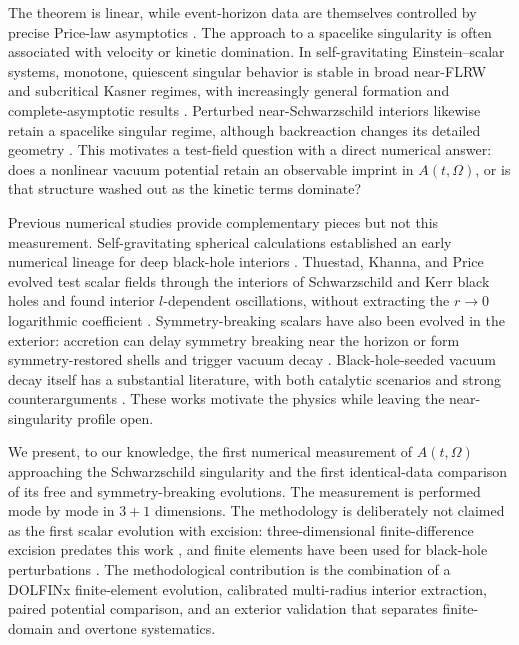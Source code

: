 \documentclass[
  aps,
  prd,
  reprint,
  superscriptaddress,
  nofootinbib,
  longbibliography
]{revtex4-2}
\begin{document}
The theorem is linear, while event-horizon data are themselves controlled by
precise Price-law asymptotics \cite{AngelopoulosAretakisGajic2018}.  The
approach to a spacelike singularity is often associated with velocity or
kinetic domination.  In self-gravitating Einstein--scalar systems, monotone,
quiescent singular behavior is stable in broad near-FLRW and subcritical
Kasner regimes, with increasingly general formation and complete-asymptotic
results \cite{RodnianskiSpeck2018,FournodavlosRodnianskiSpeck2023,
OudeGroenigerEtAl2023,FrancoGrisalesRingstrom2026}.  Perturbed
near-Schwarzschild interiors likewise retain a spacelike singular regime,
although backreaction changes its detailed geometry
\cite{AlexakisFournodavlos2020,AnGajic2020}.  This motivates a
test-field question with a direct numerical answer: does a nonlinear vacuum
potential retain an observable imprint in $A(t,\Omega)$, or is that structure
washed out as the kinetic terms dominate?

Previous numerical studies provide complementary pieces but not this
measurement.  Self-gravitating spherical calculations established an early
numerical lineage for deep black-hole interiors \cite{BradySmith1995}.
Thuestad, Khanna, and Price evolved test scalar fields through the
interiors of Schwarzschild and Kerr black holes and found interior
$l$-dependent oscillations, without extracting the $r\to0$ logarithmic
coefficient \cite{ThuestadKhannaPrice2017}.  Symmetry-breaking scalars have
also been evolved in the exterior: accretion can delay symmetry breaking near
the horizon \cite{TraykovaBradenPeiris2018} or form symmetry-restored shells
and trigger vacuum decay \cite{MarsdenEtAl2025}.  Black-hole-seeded vacuum
decay itself has a substantial literature, with both catalytic scenarios and
strong counterarguments \cite{BurdaGregoryMoss2015PRL,Strumia2023}.  These
works motivate the physics while leaving the near-singularity profile open.

We present, to our knowledge, the first numerical measurement of
$A(t,\Omega)$ approaching the Schwarzschild singularity and the first
identical-data comparison of its free and symmetry-breaking evolutions.  The
measurement is performed mode by mode in $3+1$ dimensions.  The methodology
is deliberately not claimed as the first scalar evolution with excision:
three-dimensional finite-difference excision predates this work
\cite{CalabreseEtAl2003}, and finite elements have been used for black-hole
perturbations \cite{SopuertaLaguna2006}.  The methodological contribution is
the combination of a DOLFINx finite-element evolution, calibrated multi-radius
interior extraction, paired potential comparison, and an exterior validation
that separates finite-domain and overtone systematics.
\end{document}

